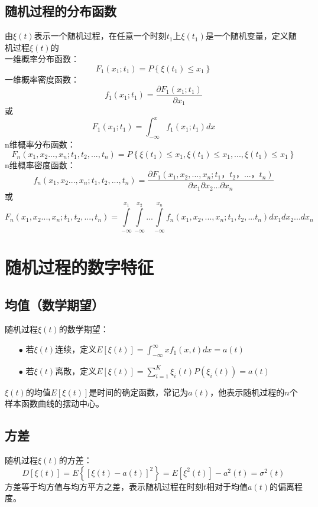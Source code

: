 \documentclass[12pt,a4paper,oneside]{ctexart}
\begin{document}
    \subsection{随机过程的分布函数}
    由$\xi(t)$表示一个随机过程，在任意一个时刻$t_{1}$上$\xi (t_{1})$是一个随机变量，定义随机过程$\xi(t)$的\\
    一维概率分布函数：
    $$
    F_{1} (x_{1};t_{1}) = P\left \{ \xi(t_{1})\le  x_{1} \right \}
    $$
    一维概率密度函数：
    $$
    f_{1} (x_{1};t_{1}) = \frac{\partial F_{1} (x_{1};t_{1})}{\partial x_{1}}
    $$
    或
    $$F_{1} (x_{1};t_{1}) = \int_{-\infty }^{x}  f_{1} (x_{1};t_{1})dx
    $$
    n维概率分布函数：
    $$
    F_{n} (x_{1},x_{2}...,x_{n};t_{1},t_{2},...,t_{n}) = P\left \{ \xi(t_{1})\le  x_{1} ,\xi(t_{1})\le  x_{1},...,\xi(t_{1})\le  x_{1}\right \}
    $$
    n维概率密度函数：
    $$
    f_{n} (x_{1},x_{2}...,x_{n};t_{1},t_{2},...,t_{n}) = \frac{\partial F_{1} (x_{1},x_{2},...,x_{n};t_{1}，t_{2}，...，t_{n})}{\partial x_{1}\partial x_{2}...\partial x_{n}}
    $$
    或
    $$
    F_{n} (x_{1},x_{2}...,x_{n};t_{1},t_{2},...,t_{n}) = \int\limits_{-\infty }^{x_{1}} \int\limits_{-\infty }^{x_{2}}...\int\limits_{-\infty }^{x_{n}}f_{n}(x_{1},x_{2},...,x_{n};t_{1},t_{2},...t_{n})dx_{1}dx_{2}...dx_{n}
    $$
\section{随机过程的数字特征}
\subsection{均值（数学期望）}
\indent 随机过程$\xi(t)$的数学期望：
    \begin{itemize}
        \item [$\bullet$] 若$\xi(t)$连续，定义$E[\xi(t)] = \int_{-\infty }^{\infty } xf_{1}(x,t)dx = a(t)$
        \item [$\bullet$] 若$\xi(t)$离散，定义$E[\xi(t)] =  {\textstyle \sum_{i=1}^{K}}\xi_{i}(t)P(\xi_{i}(t))=a(t)$ 
    \end{itemize}
\indent \indent $\xi (t)$的均值$E\left [ \xi(t) \right ] $是时间的确定函数，常记为$a(t)$，他表示随机过程的$n$个样本函数曲线的摆动中心。\\
\subsection{方差}
\indent 随机过程$\xi(t)$的方差：
$$
D\left[\xi(t)\right] = E\left\{\left[\xi(t)-a(t)\right]^{2}\right\} = E[\xi^{2}(t)] - a^{2}(t) = \sigma^{2}(t)
$$
\indent 方差等于均方值与均方平方之差，表示随机过程在时刻$t$相对于均值$a(t)$的偏离程度。
\end{document}

